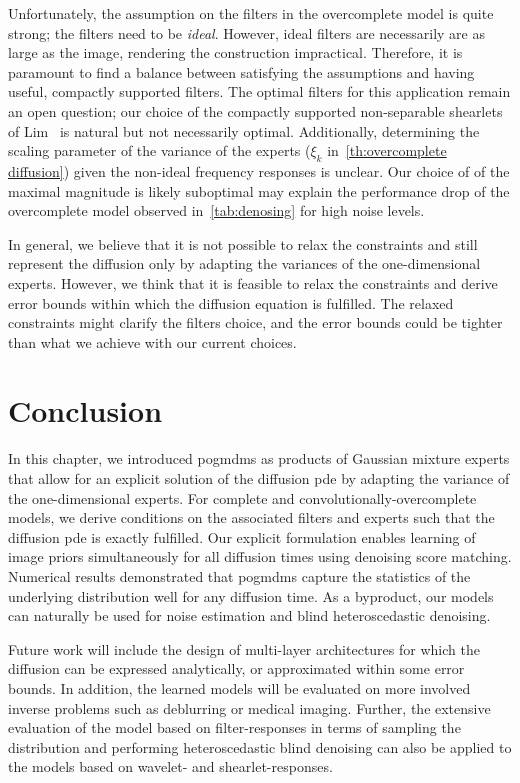 Unfortunately, the assumption on the filters in the overcomplete model is quite strong;
the filters need to be \emph{ideal}.
However, ideal filters are necessarily are as large as the image, rendering the construction impractical.
Therefore, it is paramount to find a balance between satisfying the assumptions and having useful, compactly supported filters.
The optimal filters for this application remain an open question;
our choice of the compactly supported non-separable shearlets of Lim~\cite{lim_nonseparable_2013} is natural but not necessarily optimal.
Additionally, determining the scaling parameter of the variance of the experts (\( \xi_k \) in~\cref{th:overcomplete diffusion}) given the non-ideal frequency responses is unclear.
Our choice of of the maximal magnitude is likely suboptimal may explain the performance drop of the overcomplete model observed in~\cref{tab:denosing} for high noise levels.

In general, we believe that it is not possible to relax the constraints and still represent the diffusion only by adapting the variances of the one-dimensional experts.
However, we think that it is feasible to relax the constraints and derive error bounds within which the diffusion equation is fulfilled.
The relaxed constraints might clarify the filters choice, and the error bounds could be tighter than what we achieve with our current choices.
\section{Conclusion}%
\label{sec:conclusion}
In this chapter, we introduced \glspl{pogmdm} as products of Gaussian mixture experts that allow for an explicit solution of the diffusion \gls{pde} by adapting the variance of the one-dimensional experts.
For complete and convolutionally-overcomplete models, we derive conditions on the associated filters and experts such that the diffusion \gls{pde} is exactly fulfilled.
Our explicit formulation enables learning of image priors simultaneously for all diffusion times using denoising score matching.
Numerical results demonstrated that \glspl{pogmdm} capture the statistics of the underlying distribution well for any diffusion time.
As a byproduct, our models can naturally be used for noise estimation and blind heteroscedastic  denoising.

Future work will include the design of multi-layer architectures for which the diffusion can be expressed analytically, or approximated within some error bounds.
In addition, the learned models will be evaluated on more involved inverse problems such as deblurring or medical imaging.
Further, the extensive evaluation of the model based on filter-responses in terms of sampling the distribution and performing heteroscedastic blind denoising can also be applied to the models based on wavelet- and shearlet-responses.
